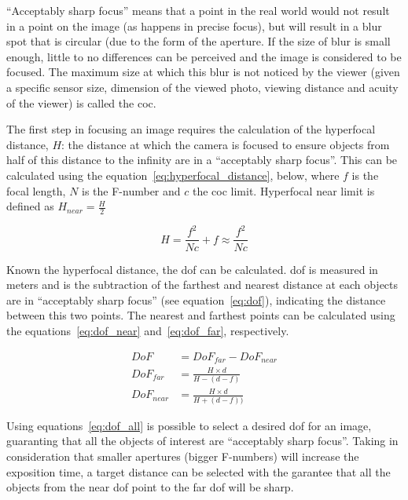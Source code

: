``Acceptably sharp focus'' means that a point in the real world would not result in a point on the image (as happens in precise focus), but will result in a blur spot that is circular (due to the form of the aperture. If the size of blur is small enough, little to no differences can be perceived and the image is considered to be focused. The maximum size at which this blur is not noticed by the viewer (given a specific sensor size, dimension of the viewed photo, viewing distance and acuity of the viewer) is called the \ac{coc}.

The first step in focusing an image requires the calculation of the hyperfocal distance, $H$: the distance at which the camera is focused to ensure objects from half of this distance to the infinity are in a ``acceptably sharp focus''. This can be calculated using the equation~\ref{eq:hyperfocal_distance}, below, where $f$ is the focal length, $N$ is the F-number and $c$ the \ac{coc} limit. Hyperfocal near limit is defined as $H_{near} = \frac{H}{2}$

\begin{equation}
	\label{eq:hyperfocal_distance}
	H = \frac{f^2}{Nc} + f \approx \frac{f^2}{Nc} 
\end{equation}

Known the hyperfocal distance, the \acf{dof} can be calculated. \ac{dof} is measured in meters and is the subtraction of the farthest and nearest distance at each objects are in ``acceptably sharp focus'' (see equation~\ref{eq:dof}), indicating the distance between this two points. The nearest and farthest points can be calculated using the equations~\ref{eq:dof_near} and~\ref{eq:dof_far}, respectively.

\begin{subequations}
	\label{eq:dof_all}
	\begin{align}
		DoF & = DoF_{far} - DoF_{near} \label{eq:dof} \\
		DoF_{far} & = \frac{H\times d}{H - (d - f)} \label{eq:dof_far} \\
		DoF_{near} & = \frac{H\times d}{H + (d - f))} \label{eq:dof_near} 
	\end{align}
\end{subequations}

Using equations~\ref{eq:dof_all} is possible to select a desired \acl{dof} for an image, guaranting that all the objects of interest are ``acceptably sharp focus''. Taking in consideration that smaller apertures (bigger F-numbers) will increase the exposition time, a target distance can be selected with the garantee that all the objects from the near \ac{dof} point to the far \ac{dof} will be sharp.


